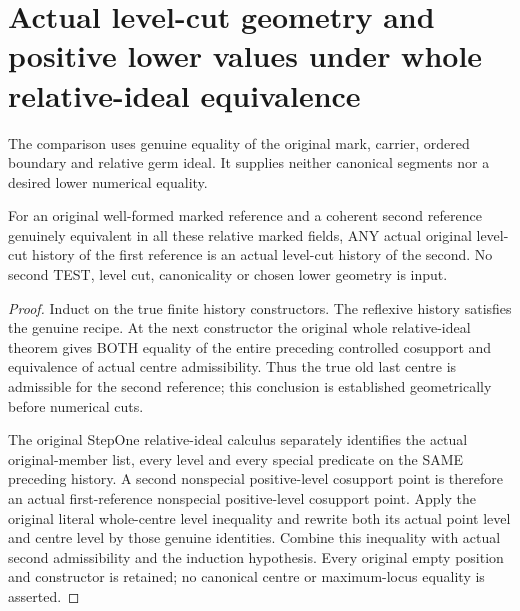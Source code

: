 \section{Actual level-cut geometry and positive lower values under whole relative-ideal equivalence}

The comparison uses genuine equality of the original mark, carrier,
ordered boundary and relative germ ideal. It supplies neither canonical
segments nor a desired lower numerical equality.

\begin{lemma}
\label{hir:original-relative-ideal-level-cut-transport}
\leanok
For an original well-formed marked reference and a coherent second
reference genuinely equivalent in all these relative marked fields, ANY
actual original level-cut history of the first reference is an actual
level-cut history of the second. No second TEST, level cut, canonicality
or chosen lower geometry is input.
\end{lemma}
\begin{proof}
Induct on the true finite history constructors. The reflexive history
satisfies the genuine recipe. At the next constructor the original whole
relative-ideal theorem gives BOTH equality of the entire preceding
controlled cosupport and equivalence of actual centre admissibility.
Thus the true old last centre is admissible for the second reference;
this conclusion is established geometrically before numerical cuts.

The original StepOne relative-ideal calculus separately identifies the
actual original-member list, every level and every special predicate on
the SAME preceding history. A second nonspecial positive-level cosupport
point is therefore an actual first-reference nonspecial positive-level
cosupport point. Apply the original literal whole-centre level inequality
and rewrite both its actual point level and centre level by those genuine
identities. Combine this inequality with actual second admissibility and
the induction hypothesis. Every original empty position and constructor
is retained; no canonical centre or maximum-locus equality is asserted.
\end{proof}

